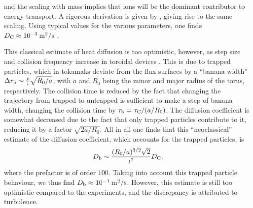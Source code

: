 and the scaling with mass implies that ions will be the dominant contributor to energy transport. A rigorous derivation is given by \citet{braginskii1958transport}, giving rise to the same scaling. Using typical values for the various parameters, one finds $D_{\rm C} \approx 10^{-3} \: {\rm m^2/s}$ \cite[p.~465]{freidberg2008plasma}. \par 
This classical estimate of heat diffusion is too optimistic, however, as step size and collision frequency increase in toroidal devices \cite[Ch.~7]{helander2005collisional}. This is due to trapped particles, which in tokamaks deviate from the flux surfaces by a ``banana width'' $\Delta r_{\rm b} \sim \frac{\rho}{\iota} \sqrt{R_0/a} $, with $a$ and $R_0$ being the minor and major radius of the torus, respectively. The collision time is reduced by the fact that changing the trajectory from trapped to untrapped is sufficient to make a step of banana width, changing the collision time by $\tau_{\rm b} = \tau_{\rm C}/(a/R_0)$. The diffusion coefficient is somewhat decreased due to the fact that only trapped particles contribute to it, reducing it by a factor $\sqrt{2 a /R_0}$. All in all one finds that this ``neoclassical'' estimate of the diffusion coefficient, which accounts for the trapped particles, is
\begin{equation}
    D_{\rm b} \sim \frac{(R_0/a)^{3/2}\sqrt{2} }{\iota^2} D_{\rm C},
\end{equation}
where the prefactor is of order $100$. Taking into account this trapped particle behaviour, we thus find $D_{\rm b} \approx 10^{-1} \: {\rm m^2/s}$. However, this estimate is still too optimistic compared to the experiments, and the discrepancy is attributed to turbulence.

